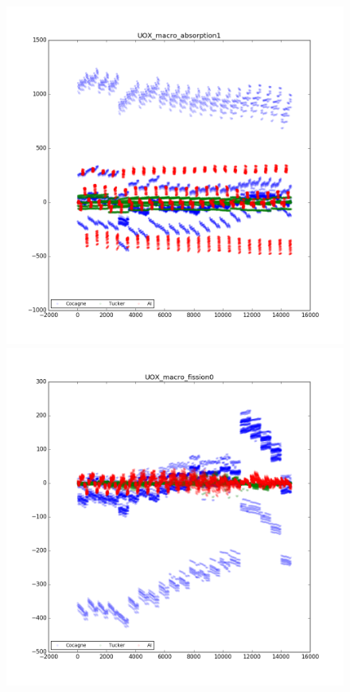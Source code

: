 \begin{center}
\begin{figure}[h]
   \begin{minipage}[b]{0.5\linewidth}
      \centering \includegraphics[scale=0.3]{images/UOX/UOX_macro_absorption1.png}
   \end{minipage}
   \begin{minipage}[b]{0.5\linewidth}
      \centering \includegraphics[scale=0.3]{images/UOX/UOX_macro_fission0.png}

\end{minipage}
\end{figure}
\end{center}
